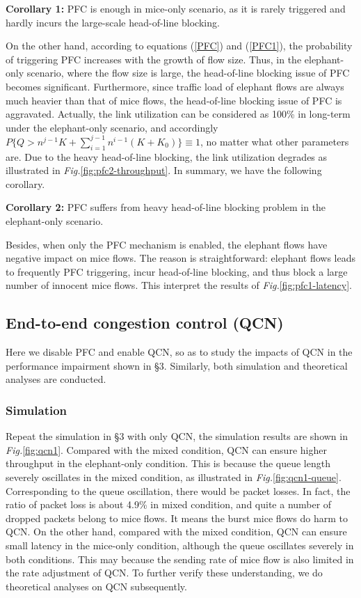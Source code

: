 \documentclass[]{sig-alternate-10pt}
\begin{document}
\noindent\textbf{Corollary 1:}
PFC is enough in mice-only scenario, as it is rarely triggered and hardly incurs the large-scale head-of-line blocking.


On the other hand, according to equations (\ref{PFC}) and (\ref{PFC1}), the probability of triggering PFC  increases with the growth of flow size.
Thus, in the elephant-only scenario, where the flow size is large, the head-of-line blocking issue of PFC becomes significant.
Furthermore, since traffic load of elephant flows are always much heavier than that of mice flows, the head-of-line blocking issue of PFC is aggravated.
Actually, the link utilization can be considered as 100\% in long-term under the elephant-only scenario, and accordingly $P\{Q>n^{j-1}K+\sum_{i=1}^{j-1}n^{i-1}(K+K_0)\}\equiv1$, no matter what other parameters are.
Due to the heavy head-of-line blocking, the link utilization degrades as illustrated in \emph{Fig.}\ref{fig:pfc2-throughput}.
In summary, we have the following corollary.

\noindent\textbf{Corollary 2:}
PFC suffers from heavy head-of-line blocking problem in the elephant-only scenario.


Besides, when only the PFC mechanism is enabled, the elephant flows have negative impact on mice flows. The reason is straightforward: elephant flows leads to frequently PFC triggering, incur head-of-line blocking, and thus block a large number of innocent mice flows.
This interpret the results of \emph{Fig.}\ref{fig:pfc1-latency}.

\subsection{End-to-end congestion control (QCN)}

Here we disable PFC and enable QCN, so as to study the impacts of QCN in the performance impairment shown in \S3.
Similarly, both simulation and theoretical analyses are conducted.


\subsubsection{Simulation}

Repeat the simulation in \S3 with only QCN, the simulation results are shown in \emph{Fig.}\ref{fig:qcn1}.
Compared with the mixed condition, QCN can ensure higher throughput in the elephant-only condition.
This is because the queue length severely oscillates in the mixed condition, as illustrated in \emph{Fig.}\ref{fig:qcn1-queue}. Corresponding to the queue oscillation, there would be packet losses. 
In fact, the ratio of packet loss is about 4.9\% in mixed condition, and quite a number of dropped packets belong to mice flows.
It means the burst mice flows do harm to QCN. 
On the other hand, compared with the mixed condition, QCN can ensure small latency in the mice-only condition, although the queue oscillates severely in both conditions.
This may because the sending rate of mice flow is also limited in the rate adjustment of QCN.
To further verify these understanding, we do theoretical analyses on QCN subsequently. 
\end{document}
